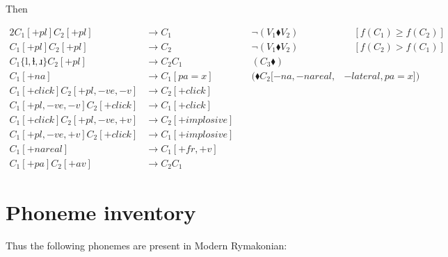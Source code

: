\documentclass{book}
\newcommand{\lname}{Modern Rymakonian}
\begin{document}
Then

\begin{alignat*}{2}
  C_1[+pl] C_2[+pl] &\rightarrow C_1 &\quad \lnot(V_1 \blacklozenge V_2) &\quad[f(C_1) \ge f(C_2)] \\
  C_1[+pl] C_2[+pl] &\rightarrow C_2 &\quad \lnot(V_1 \blacklozenge V_2) &\quad[f(C_2) > f(C_1)] \\
  C_1\{\text{l}, \text{ɫ}, \text{ɹ}\} C_2[+pl] &\rightarrow C_2 C_1 &\quad(C_3 \blacklozenge) \\
  C_1[+na] &\rightarrow C_1[pa=x] &\quad(\blacklozenge C_2[-na, -nareal,& -lateral, pa=x]) \\
  C_1[+click] C_2[+pl, -ve, -v] &\rightarrow C_2[+click] \\
  C_1[+pl, -ve, -v] C_2[+click] &\rightarrow C_1[+click] \\
  C_1[+click] C_2[+pl, -ve, +v] &\rightarrow C_2[+implosive] \\
  C_1[+pl, -ve, +v] C_2[+click] &\rightarrow C_1[+implosive] \\
  C_1[+nareal] &\rightarrow C_1[+fr, +v] \\
  C_1[+pa] C_2[+av] &\rightarrow C_2 C_1
\end{alignat*}

\section{Phoneme inventory}

Thus the following phonemes are present in \lname:
\end{document}
